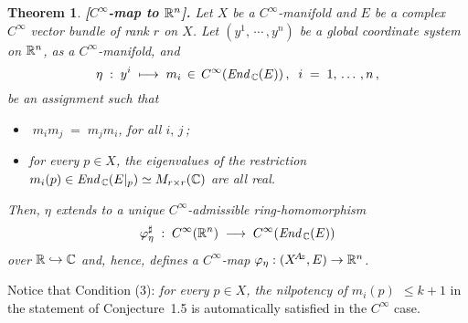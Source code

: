 \documentclass[11pt]{article}
\newtheorem{theorem}{Theorem}[subsection]
\numberwithin{equation}{subsection}
\newcommand{\End}{\mbox{\it End}\,}
\begin{document}
\begin{theorem} {\bf [$C^{\infty}$-map to ${\Bbb R}^n$].}
 Let
  $X$ be a $C^{\infty}$-manifold  and
  $E$ be a complex $C^{\infty}$ vector bundle of rank $r$ on $X$.
 Let
  $(y^1,\,\cdots\,, y^n)$ be a global coordinate system on ${\Bbb R}^n$,
  as a $C^{\infty}$-manifold, and
  $$
    \eta\;:\; y^i\; \longmapsto\; m_i\,\in\, C^{\infty}(\End_{\Bbb C}(E))\,,\;\;
	i\;=\;1,\,\ldots\,,n\,,
  $$
 be an assignment  such that
  \begin{itemize}
   \item[(1)]
     $\;m_im_j\;=\;m_jm_i$, for all $i,\,j\,$;

   \item[(2)]
    for every $p\in X$,
	 the eigenvalues of the restriction
	   $m_i(p)\in \End_{\Bbb C}(E|_p)\simeq M_{r\times r}({\Bbb C})$
	   are all real.
 \end{itemize}
 Then,
  $\eta$ extends to a unique $C^{\infty}$-admissible ring-homomorphism
  $$
    \varphi_{\eta}^{\sharp}\;:\;
	 C^{\infty}({\Bbb R}^n)\; \longrightarrow\; C^{\infty}(\End_{\Bbb C}(E))
  $$
  over ${\Bbb R}\hookrightarrow{\Bbb C}$ and, hence,
  defines a $C^{\infty}$-map $\varphi_{\eta}:(X^{\!A\!z},E)\rightarrow {\Bbb R}^n$.
\end{theorem}

\bigskip

Notice that Condition (3): {\it for every $p\in X$, the nilpotency of $m_i(p)$ $\le k+1$}
 in the statement of Conjecture~1.5 is automatically satisfied in the $C^{\infty}$ case.

\bigskip
\end{document}
